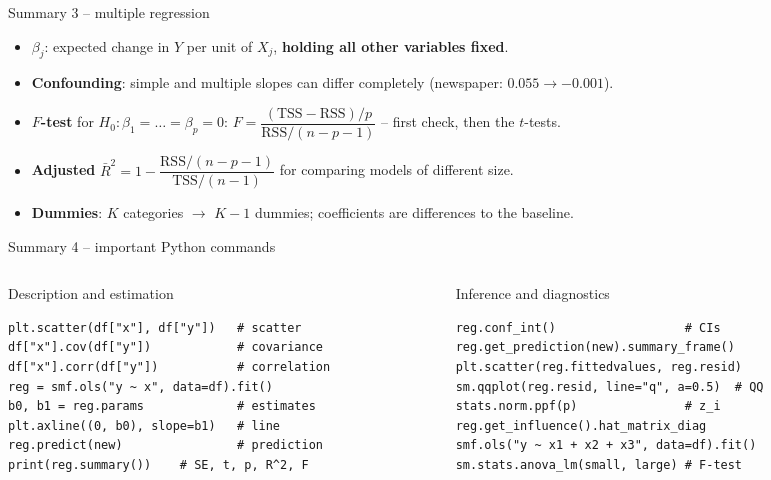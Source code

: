 \documentclass[aspectratio=169,11pt]{beamer}
\begin{document}
\begin{frame}{Summary 3 -- multiple regression}
  \begin{itemize}\setlength{\itemsep}{4pt}
    \item $\beta_j$: expected change in $Y$ per unit of $X_j$,
          \textbf{holding all other variables fixed}.
    \item \textbf{Confounding}: simple and multiple slopes can differ
          completely (newspaper: $0.055\to-0.001$).
    \item \textbf{$F$-test} for $H_0:\beta_1=\dots=\beta_p=0$:
          $F=\dfrac{(\text{TSS}-\text{RSS})/p}{\text{RSS}/(n-p-1)}$ -- first
          check, then the $t$-tests.
    \item \textbf{Adjusted} $\bar R^2=1-\dfrac{\text{RSS}/(n-p-1)}{\text{TSS}/(n-1)}$
          for comparing models of different size.
    \item \textbf{Dummies}: $K$ categories $\to$ $K-1$ dummies; coefficients
          are differences to the baseline.
  \end{itemize}
\end{frame}

\begin{frame}[fragile]{Summary 4 -- important Python commands}
  \begin{columns}[T]
    \begin{column}{0.5\textwidth}
      \begin{block}{Description and estimation}
\begin{lstlisting}
plt.scatter(df["x"], df["y"])   # scatter
df["x"].cov(df["y"])            # covariance
df["x"].corr(df["y"])           # correlation
reg = smf.ols("y ~ x", data=df).fit()
b0, b1 = reg.params             # estimates
plt.axline((0, b0), slope=b1)   # line
reg.predict(new)                # prediction
print(reg.summary())    # SE, t, p, R^2, F
\end{lstlisting}
      \end{block}
    \end{column}
    \begin{column}{0.48\textwidth}
      \begin{block}{Inference and diagnostics}
\begin{lstlisting}
reg.conf_int()                  # CIs
reg.get_prediction(new).summary_frame()
plt.scatter(reg.fittedvalues, reg.resid)
sm.qqplot(reg.resid, line="q", a=0.5)  # QQ
stats.norm.ppf(p)               # z_i
reg.get_influence().hat_matrix_diag
smf.ols("y ~ x1 + x2 + x3", data=df).fit()
sm.stats.anova_lm(small, large) # F-test
\end{lstlisting}
      \end{block}
    \end{column}
  \end{columns}
\end{frame}
\end{document}
